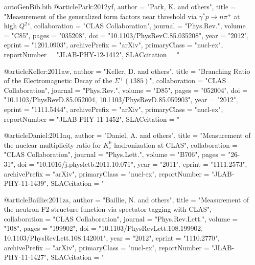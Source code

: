 \begin{filecontents*}{autoGenBib.bib}
@article{Park:2012yf,
      author         = "Park, K. and others",
      title          = "{Measurement of the generalized form factors near
                        threshold via $\gamma^* p \to n\pi^+$ at high $Q^2$}",
      collaboration  = "CLAS Collaboration",
      journal        = "Phys.Rev.",
      volume         = "C85",
      pages          = "035208",
      doi            = "10.1103/PhysRevC.85.035208",
      year           = "2012",
      eprint         = "1201.0903",
      archivePrefix  = "arXiv",
      primaryClass   = "nucl-ex",
      reportNumber   = "JLAB-PHY-12-1412",
      SLACcitation   = "%
}

@article{Keller:2011aw,
      author         = "Keller, D. and others",
      title          = "{Branching Ratio of the Electromagnetic Decay of the
                        $\Sigma^{+}(1385)$}",
      collaboration  = "CLAS Collaboration",
      journal        = "Phys.Rev.",
      volume         = "D85",
      pages          = "052004",
      doi            = "10.1103/PhysRevD.85.052004, 10.1103/PhysRevD.85.059903",
      year           = "2012",
      eprint         = "1111.5444",
      archivePrefix  = "arXiv",
      primaryClass   = "nucl-ex",
      reportNumber   = "JLAB-PHY-11-1452",
      SLACcitation   = "%
}

@article{Daniel:2011nq,
      author         = "Daniel, A. and others",
      title          = "{Measurement of the nuclear multiplicity ratio for
                        $K^0_s$ hadronization at CLAS}",
      collaboration  = "CLAS Collaboration",
      journal        = "Phys.Lett.",
      volume         = "B706",
      pages          = "26-31",
      doi            = "10.1016/j.physletb.2011.10.071",
      year           = "2011",
      eprint         = "1111.2573",
      archivePrefix  = "arXiv",
      primaryClass   = "nucl-ex",
      reportNumber   = "JLAB-PHY-11-1439",
      SLACcitation   = "%
}

@article{Baillie:2011za,
      author         = "Baillie, N. and others",
      title          = "{Measurement of the neutron F2 structure function via
                        spectator tagging with CLAS}",
      collaboration  = "CLAS Collaboration",
      journal        = "Phys.Rev.Lett.",
      volume         = "108",
      pages          = "199902",
      doi            = "10.1103/PhysRevLett.108.199902,
                        10.1103/PhysRevLett.108.142001",
      year           = "2012",
      eprint         = "1110.2770",
      archivePrefix  = "arXiv",
      primaryClass   = "nucl-ex",
      reportNumber   = "JLAB-PHY-11-1427",
      SLACcitation   = "%
}


\end{filecontents*}
